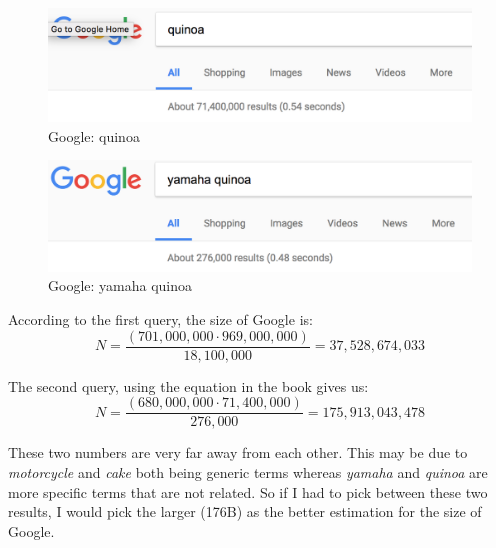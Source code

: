 \documentclass[10pt,letterpaper,bibliography=totoc]{scrartcl}
\begin{document}
\begin{figure}[h!]
\centering
\label{fig:quinoaGoogle}
\includegraphics[scale=.5]{quinoa_google.png}
\caption{Google: quinoa}
\end{figure}
\begin{figure}[h!]
\centering
\label{fig:yamahaQuinoaGoogle}
\includegraphics[scale=.5]{yamaha-quinoa_google.png}
\caption{Google: yamaha quinoa}
\end{figure}
\hfill \linebreak

According to the first query, the size of Google is:
\begin{equation}\label{eq:GoogleSize1}
    N = \frac{(701,000,000 \cdot 969,000,000)}{18,100,000} = 37,528,674,033
\end{equation}

The second query, using the equation in the book gives us:
\begin{equation}\label{eq:GoogleSize2}
    N = \frac{(680,000,000 \cdot 71,400,000)}{276,000} = 175,913,043,478
\end{equation}

These two numbers are very far away from each other. This may be due to \textit{motorcycle} and \textit{cake} both being generic terms whereas \textit{yamaha} and \textit{quinoa} are more specific terms that are not related. So if I had to pick between these two results, I would pick the larger (176B) as the better estimation for the size of Google.
\end{document}
